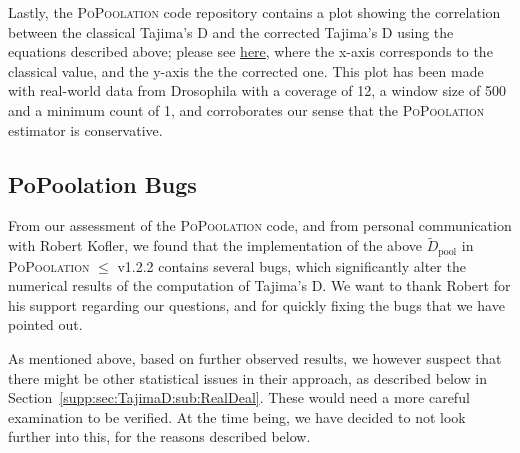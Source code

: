 \documentclass[a4paper,fontsize=9pt,DIV=14]{scrartcl}
\newcounter{todo}
\newcommand\todo[1]{}
\newcommand\toolname{\textsc}
\newcommand\secref[1]{Section~\ref{#1}}
\begin{document}
Lastly, the \toolname{PoPoolation} code repository contains a plot showing the correlation between the classical Tajima's D
and the corrected Tajima's D using the equations described above;
please see \href{https://github.com/lczech/popoolation/raw/master/files/correlation_classic_correctedTajimasD.png}{here},
where the x-axis corresponds to the classical value, and the y-axis the the corrected one.
This plot has been made with real-world data from Drosophila with a coverage of 12,
a window size of 500 and a minimum count of 1, and corroborates our sense that the \toolname{PoPoolation} estimator is conservative.





\subsection{PoPoolation Bugs}
\label{supp:sec:TajimaD:sub:Bugs}

From our assessment of the \toolname{PoPoolation} code, and from personal communication with Robert Kofler, we found that the implementation of the above $\tilde{D}_\text{pool}$ in \toolname{PoPoolation} $\leq$ v1.2.2 contains several bugs, which significantly alter the numerical results of the computation of Tajima's D.
We want to thank Robert for his support regarding our questions, and for quickly fixing the bugs that we have pointed out.  

As mentioned above, based on further observed results, we however suspect that there might be other statistical issues in their approach, as described below in \secref{supp:sec:TajimaD:sub:RealDeal}. These would need a more careful examination to be verified. At the time being, we have decided to not look further into this, for the reasons described below.
\end{document}
